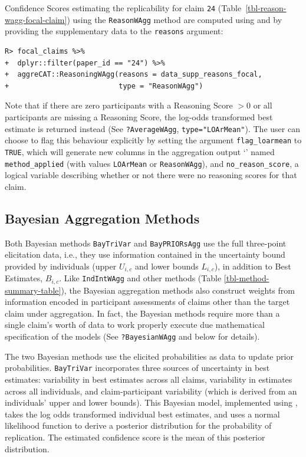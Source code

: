 \documentclass[article]{jss}
\newcommand{\class}[1]{`\code{#1}'}
\newcommand{\fct}[1]{\code{#1()}}
\begin{document}
Confidence Scores estimating the replicability for claim \texttt{24}
(Table~\ref{tbl-reason-wagg-focal-claim}) using the \texttt{ReasonWAgg}
method are computed using \fct{ReasoningWAgg} and by providing the
supplementary data to the \texttt{reasons} argument:

\begin{verbatim}
R> focal_claims %>%
+  dplyr::filter(paper_id == "24") %>%
+  aggreCAT::ReasoningWAgg(reasons = data_supp_reasons_focal,
+                          type = "ReasonWAgg")
\end{verbatim}

Note that if there are zero participants with a Reasoning Score \(>0\)
or all participants are missing a Reasoning Score, the log-odds
transformed best estimate is returned instead (See
\texttt{?AverageWAgg}, \texttt{type="LOArMean"}). The user can choose to
flag this behaviour explicitly by setting the argument
\texttt{flag\_loarmean} to \texttt{TRUE}, which will generate new
columns in the aggregation output \class{data.frame} named
\texttt{method\_applied} (with values \texttt{LOArMean} or
\texttt{ReasonWAgg}), and \texttt{no\_reason\_score}, a logical variable
describing whether or not there were no reasoning scores for that claim.

\subsection{Bayesian Aggregation
Methods}\label{bayesian-aggregation-methods}

Both Bayesian methods \texttt{BayTriVar} and \texttt{BayPRIORsAgg} use
the full three-point elicitation data, i.e., they use information
contained in the uncertainty bound provided by individuals (upper
\({U}_{i,c}\) and lower bounds \({L}_{i,c}\)), in addition to Best
Estimates, \(B_{i,c}\). Like \texttt{IndIntWAgg} and other methods
(Table \ref{tbl-method-summary-table}), the Bayesian aggregation methods
also construct weights from information encoded in participant
assessments of claims other than the target claim under aggregation. In
fact, the Bayesian methods require more than a single claim's worth of
data to work properly execute due mathematical specification of the
models (See \texttt{?BayesianWAgg} and below for details).

The two Bayesian methods use the elicited probabilities as data to
update prior probabilities. \texttt{BayTriVar} incorporates three
sources of uncertainty in best estimates: variability in best estimates
across all claims, variability in estimates across all individuals, and
claim-participant variability (which is derived from an individuals'
upper and lower bounds). This Bayesian model, implemented using
 \citep{R2JAGS}, takes the log odds transformed individual
best estimates, and uses a normal likelihood function to derive a
posterior distribution for the probability of replication. The estimated
confidence score is the mean of this posterior distribution.
\end{document}
